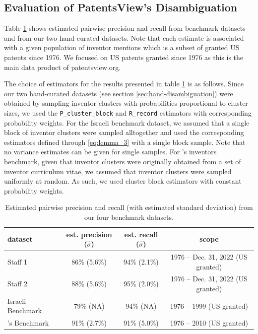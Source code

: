 \documentclass[fontsize=11pt]{article}
\theoremstyle{definition}
\begin{document}
\subsection{Evaluation of PatentsView's Disambiguation}

Table \ref{tab:results} shows estimated pairwise precision and recall from benchmark datasets and from our two hand-curated datasets. Note that each estimate is associated with a given population of inventor mentions which is a subset of granted US patents since 1976. We focused on US patents granted since 1976 as this is the main data product of patentsview.org.

The choice of estimators for the results presented in table \ref{tab:results} is as follows.
Since our two hand-curated datasets (see section \ref{sec:hand-disambiguation}) were obtained by sampling inventor clusters with probabilities proportional to cluster sizes, we used the \texttt{P\_cluster\_block} and \texttt{R\_record} estimators with corresponding probability weights. 
For the Israeli benchmark dataset, we assumed that a single block of inventor clusters were sampled alltogether and used the corresponding estimators defined through \eqref{eq:lemma_3} with a single block sample. Note that no variance estimates can be given for single samples.
For \cite{Li2014}'s inventors benchmark, given that inventor clusters were originally obtained from a set of inventor curriculum vitae, we assumed that inventor clusters were sampled uniformly at random. As such, we used cluster block estimators with constant probability weights.

\begin{table}[!h]
    \label{tab:results}
    \centering
    \caption{\centering Estimated pairwise precision and recall (with estimated standard deviation) from our four benchmark datasets.}
    \begin{tabular}{lccc}
    \toprule
    \textbf{dataset} & \textbf{est. precision ($\hat \sigma$)} & \textbf{est. recall ($\hat \sigma$)} & \textbf{scope} \\
    \midrule
    Staff 1 & 86\% (5.6\%) & 94\% (2.1\%)  & 1976 -- Dec. 31, 2022 (US granted)\\
    Staff 2 & 88\% (5.6\%) & 95\% (2.0\%) & 1976 -- Dec. 31, 2022 (US granted)\\
    Israeli Benchmark & 79\% (NA) & 94\% (NA) & 1976 -- 1999 (US granted)\\
    \cite{Li2014}'s Benchmark & 91\% (2.7\%) & 91\% (5.0\%) & 1976 -- 2010 (US granted)\\
    \bottomrule
    \end{tabular}
\end{table}
\end{document}
